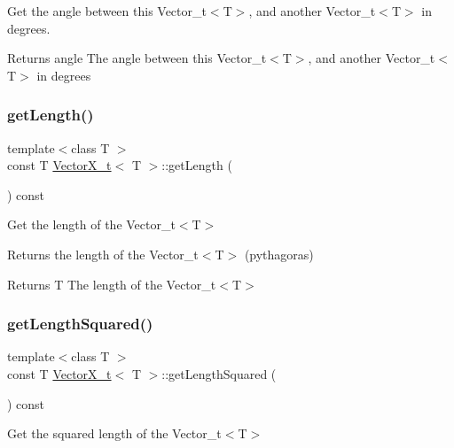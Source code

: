 Get the angle between this Vector\+\_\+t$<$\+T$>$, and another Vector\+\_\+t$<$\+T$>$ in degrees. 

\begin{DoxyReturn}{Returns}
angle The angle between this Vector\+\_\+t$<$\+T$>$, and another Vector\+\_\+t$<$\+T$>$ in degrees 
\end{DoxyReturn}
\mbox{\label{class_vector_x__t_aa1548451f4620694a671d9b15be69ba2}} 
\subsubsection{\texorpdfstring{get\+Length()}{getLength()}}
{\footnotesize\ttfamily template$<$class T $>$ \\
const T \hyperlink{class_vector_x__t}{Vector\+X\+\_\+t}$<$ T $>$\+::get\+Length (\begin{DoxyParamCaption}{ }\end{DoxyParamCaption}) const}



Get the length of the Vector\+\_\+t$<$\+T$>$ 

Returns the length of the Vector\+\_\+t$<$\+T$>$ (pythagoras)

\begin{DoxyReturn}{Returns}
T The length of the Vector\+\_\+t$<$\+T$>$ 
\end{DoxyReturn}
\mbox{\label{class_vector_x__t_a2b6ed2553246864a1f903619de4e0786}} 
\subsubsection{\texorpdfstring{get\+Length\+Squared()}{getLengthSquared()}}
{\footnotesize\ttfamily template$<$class T $>$ \\
const T \hyperlink{class_vector_x__t}{Vector\+X\+\_\+t}$<$ T $>$\+::get\+Length\+Squared (\begin{DoxyParamCaption}{ }\end{DoxyParamCaption}) const}



Get the squared length of the Vector\+\_\+t$<$\+T$>$ 

